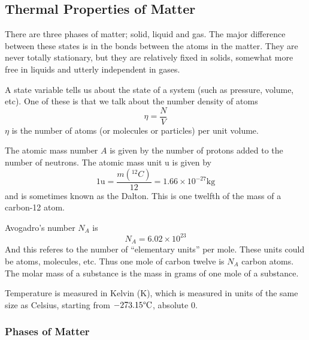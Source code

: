 \documentclass[12pt]{report}
\begin{document}
\begin{flushleft}
\subsection*{Thermal Properties of Matter}

There are three phases of matter; solid, liquid and gas. The major difference
between these states is in the bonds between the atoms in the matter. They are
never totally stationary, but they are relatively fixed in solids, somewhat
more free in liquids and utterly independent in gases. \par
A state variable tells us about the state of a system (such as pressure,
volume, etc). One of these is that we talk about the number density of atoms
\[\eta = \frac{N}{V}\]
\(\eta\) is the number of atoms (or molecules or particles) per unit volume.
\par
The atomic mass number \(A\) is given by the number of protons added to the
number of neutrons. The atomic mass unit \(\mathrm{u}\) is given by
\[1\mathrm{u} = \frac{m\left(^{12}C\right)}{12}
= 1.66\times10^{-27}\mathrm{kg}\]
and is sometimes known as the Dalton. This is one twelfth of the mass of a
carbon-12 atom. \par
Avogadro's number \(N_A\) is
\[N_A = 6.02\times10^23\]
And this referes to the number of ``elementary units'' per mole. These units
could be atoms, molecules, etc. Thus one mole of carbon twelve is \(N_A\)
carbon atoms. The molar mass of a substance is the mass in grams of one mole of
a substance. \par
Temperature is measured in Kelvin (\(\mathrm{K}\)), which is measured in units
of the same size as Celsius, starting from \(-273.15\degree\mathrm{C}\),
absolute \(0\). \par

\subsubsection*{Phases of Matter}


\end{flushleft}
\end{document}
